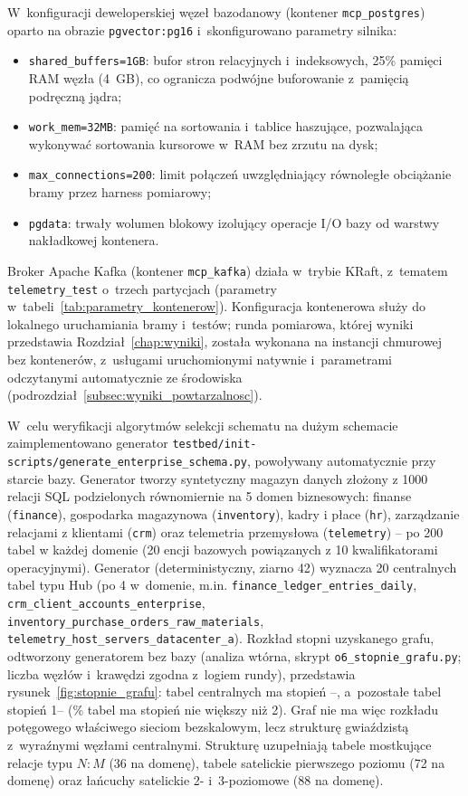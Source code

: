 W~konfiguracji deweloperskiej węzeł bazodanowy (kontener \texttt{mcp\_postgres}) oparto na obrazie \texttt{pgvector:}\allowbreak\texttt{pg16} i~skonfigurowano parametry silnika:
\begin{itemize}
    \item \texttt{shared\_buffers=1GB}: bufor stron relacyjnych i~indeksowych, 25\% pamięci RAM węzła (4~GB), co ogranicza podwójne buforowanie z~pamięcią podręczną jądra;
    \item \texttt{work\_mem=32MB}: pamięć na sortowania i~tablice haszujące, pozwalająca wykonywać sortowania kursorowe w~RAM bez zrzutu na dysk;
    \item \texttt{max\_connections=200}: limit połączeń uwzględniający równoległe obciążanie bramy przez harness pomiarowy;
    \item \texttt{pgdata}: trwały wolumen blokowy izolujący operacje I/O bazy od warstwy nakładkowej kontenera.
\end{itemize}

Broker Apache Kafka (kontener \texttt{mcp\_kafka}) działa w~trybie KRaft, z~tematem \texttt{telemetry\_test} o~trzech partycjach (parametry w~tabeli~\ref{tab:parametry_kontenerow}). Konfiguracja kontenerowa służy do lokalnego uruchamiania bramy i~testów; runda pomiarowa, której wyniki przedstawia Rozdział~\ref{chap:wyniki}, została wykonana na instancji chmurowej bez kontenerów, z~usługami uruchomionymi natywnie i~parametrami odczytanymi automatycznie ze środowiska (podrozdział~\ref{subsec:wyniki_powtarzalnosc}).

W~celu weryfikacji algorytmów selekcji schematu na dużym schemacie zaimplementowano generator \texttt{testbed/init-scripts/}\allowbreak\texttt{generate\_enterprise\_schema.py}, powoływany automatycznie przy starcie bazy. Generator tworzy syntetyczny magazyn danych złożony z 1000 relacji SQL podzielonych równomiernie na 5 domen biznesowych: finanse (\texttt{finance}), gospodarka magazynowa (\texttt{inventory}), kadry i płace (\texttt{hr}), zarządzanie relacjami z klientami (\texttt{crm}) oraz telemetria przemysłowa (\texttt{telemetry}) -- po 200 tabel w każdej domenie (20 encji bazowych powiązanych z 10 kwalifikatorami operacyjnymi). Generator (deterministyczny, ziarno 42) wyznacza 20 centralnych tabel typu Hub (po 4 w~domenie, m.in. \texttt{finance\_ledger\_entries\_daily}, \texttt{crm\_client\_accounts\_enterprise}, \texttt{inventory\_purchase\_orders\_raw\_materials}, \texttt{telemetry\_host\_servers\_datacenter\_a}). Rozkład stopni uzyskanego grafu, odtworzony generatorem bez bazy (analiza wtórna, skrypt \texttt{o6\_stopnie\_grafu.py}; liczba węzłów i~krawędzi zgodna z~logiem rundy), przedstawia rysunek~\ref{fig:stopnie_grafu}: \wynOsixHubs{} tabel centralnych ma stopień \wynOsixHubMin--\wynOsixHubMax, a~pozostałe \wynOsixPeriph{} tabel stopień 1--\wynOsixPeriphMax{} (\wynOsixLeTwo\% tabel ma stopień nie większy niż 2). Graf nie ma więc rozkładu potęgowego właściwego sieciom bezskalowym, lecz strukturę gwiaździstą z~wyraźnymi węzłami centralnymi. Strukturę uzupełniają tabele mostkujące relacje typu $N:M$ (36 na domenę), tabele satelickie pierwszego poziomu (72 na domenę) oraz łańcuchy satelickie 2- i~3-poziomowe (88 na domenę).

